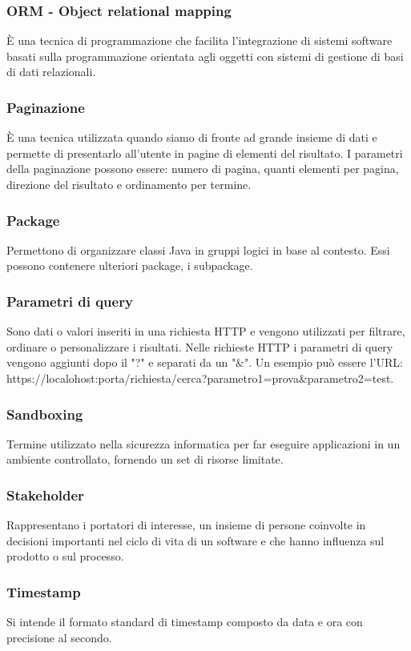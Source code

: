 \subsubsection*{ORM - Object relational mapping}
È una tecnica di programmazione che facilita l'integrazione di sistemi software basati sulla programmazione orientata agli oggetti con sistemi di gestione di basi di dati relazionali.
\subsubsection*{Paginazione}
È una tecnica utilizzata quando siamo di fronte ad grande insieme di dati e permette di presentarlo all'utente in pagine di elementi del risultato. I parametri della paginazione possono essere: numero di pagina, quanti elementi per pagina, direzione del risultato e ordinamento per termine.
\subsubsection*{Package}
Permettono di organizzare classi Java in gruppi logici in base al contesto. Essi possono contenere ulteriori package, i subpackage.
\subsubsection*{Parametri di query}
Sono dati o valori inseriti in una richiesta HTTP e vengono utilizzati per filtrare, ordinare o personalizzare i risultati. Nelle richieste HTTP i parametri di query vengono aggiunti dopo il "?" e separati da un "\&". Un esempio può essere l'URL: https://localohost:porta/richiesta/cerca?parametro1=prova\&parametro2=test.
\subsubsection*{Sandboxing}
Termine utilizzato nella sicurezza informatica per far eseguire applicazioni in un ambiente controllato, fornendo un set di risorse limitate.
\subsubsection*{Stakeholder}
Rappresentano i portatori di interesse, un insieme di persone coinvolte in decisioni importanti nel ciclo di vita di un software e che hanno influenza sul prodotto o sul processo.
\subsubsection*{Timestamp}
Si intende il formato standard di timestamp composto da data e ora con precisione al secondo.
